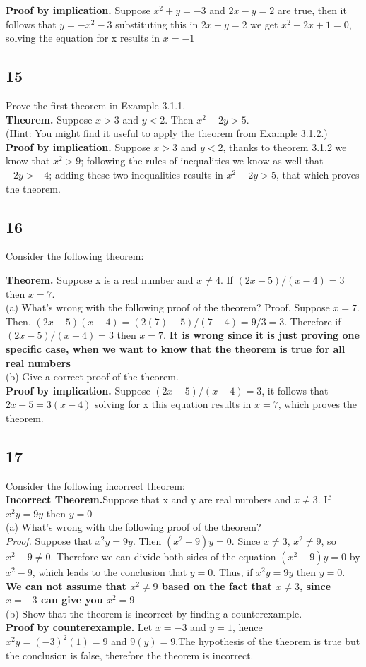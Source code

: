 \documentclass{article}
\begin{document}
\textbf{Proof by implication.}
Suppose $x^2 + y = -3 $ and $2x -y = 2$ are true, then it follows that $y= -x^2 -3$ substituting this in $2x -y = 2$ we get $x^2 + 2x +1 = 0$, solving the equation for x results in $x= -1$
\subsection{15}
Prove the first theorem in Example 3.1.1.
\\
\textbf{Theorem. }Suppose $x>3$ and $y<2$. Then $x^2-2y>5$.
\\
(Hint: You might find it useful to apply the theorem from Example 3.1.2.)
\\

\textbf{Proof by implication.}
Suppose $x>3$ and $y<2$, thanks to theorem 3.1.2 we know that $x^2>9$; following the rules of inequalities we know as well that  $-2y >-4$; adding these two inequalities results in $x^2-2y>5$, that which proves the theorem.
\subsection{16}
Consider the following theorem:

\textbf{Theorem.} Suppose x is a real number and  $x \neq 4 $. If $(2x-5)/(x-4)= 3$ then $x = 7$.
\\
(a) What's wrong with the following proof of the theorem?
Proof. Suppose $x = 7$. Then. $(2x-5)(x-4)=(2(7)-5)/(7-4)= 9/3=3$. Therefore if $(2x-5)/(x-4)= 3 $ then $x = 7$. 
\textbf{It is wrong since it is just proving one specific case, when we want to know that the theorem is true for all real numbers}
\\
(b) Give a correct proof of the theorem.
\\
\textbf{Proof by implication.} Suppose $(2x-5)/(x-4)= 3$, it follows that $2x-5=3(x-4)$ solving for x this equation results in $x=7$, which proves the theorem.
\newpage

\subsection{17}
Consider the following incorrect theorem:
\\
\textbf{Incorrect Theorem.}Suppose that x and y are real numbers and $x \neq 3$. If $x^2 y = 9y$ then $y = 0$
\\
(a) What's wrong with the following proof of the theorem? 
\\
\textit{Proof.} Suppose that  $x^2 y = 9y$. Then $(x^2-9)y=0$. Since $x \neq 3$, $x^2 \neq 9$, so $x^2-9 \neq 0$. Therefore we can divide both sides of the equation $(x^2-9)y = 0$ by $x^2-9$, which leads to the conclusion that $y=0$. Thus, if $x^2y=9y$ then $y=0$.
\\
\textbf{We can not assume that $x^2 \neq 9$ based on the fact that $x \neq 3 $, since $x=-3$ can give you $x^2 = 9$ }
\\
(b) Show that the theorem is incorrect by finding a counterexample.
\\
\textbf{Proof by counterexample.} Let $x=-3$ and $y=1$, hence  $x^2 y=(-3)^2 (1)=9$ and $9(y)=9$.The hypothesis of the theorem is true but the conclusion is false, therefore the theorem is incorrect.
\end{document}
